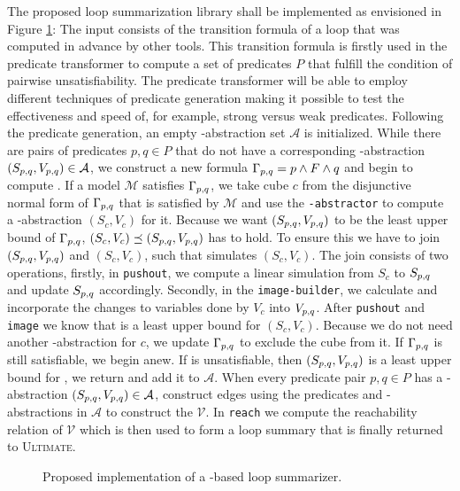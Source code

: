 
The proposed \qvasrs loop summarization library shall be implemented as envisioned in Figure \ref{fig}: The input consists of the transition formula of a loop that was computed in advance by other tools. This transition formula is firstly used in the predicate transformer to compute a set of predicates $P$ that fulfill the condition of pairwise unsatisfiability. The predicate transformer will be able to employ different techniques of predicate generation making it possible to test the effectiveness and speed of, for example, strong versus weak predicates. Following the predicate generation, an empty \qvasr-abstraction set $\mathcal{A}$ is initialized. While there are pairs of predicates $p, q \in P$ that do not have a corresponding \qvasr-abstraction $(S_{p, q}, V_{p, q}) \in \mathcal{A}$, we construct a new formula $\Gamma_{p, q} = p \land F \land q$ and begin to compute \pqvasr. If a model $\mathcal{M}$ satisfies $\Gamma_{p, q}$, we take cube $c$ from the disjunctive normal form of $\Gamma_{p, q}$ that is satisfied by $\mathcal{M}$ and use the \texttt{\qvasr-abstractor} to compute a \qvasr-abstraction $(S_c, V_c)$ for it. Because we want $(S_{p, q}, V_{p, q})$ to be the least upper bound of $\Gamma_{p, q}$, $(S_c, V_c) \preceq (S_{p, q}, V_{p, q})$ has to hold. To ensure this we have to join $(S_{p, q}, V_{p, q})$ and $(S_c, V_c)$, such that \pqvasr simulates $(S_c, V_c)$. The join consists of two operations, firstly, in \texttt{pushout}, we compute a linear simulation from $S_c$ to $S_{p, q}$ and update $S_{p, q}$ accordingly. Secondly, in the \texttt{image-builder}, we calculate and incorporate the changes to variables done by $V_c$ into $V_{p, q}$. After \texttt{pushout} and \texttt{image} we know that \pqvasr is a least upper bound for $(S_c, V_c)$. Because we do not need another \qvasr-abstraction for $c$, we update $\Gamma_{p, q}$ to exclude the cube from it. If $\Gamma_{p, q}$ is still satisfiable, we begin anew.
If \pqformula is unsatisfiable, then $(S_{p, q}, V_{p, q})$ is a least upper bound for \pqformula, we return and add it to $\mathcal{A}$. When every predicate pair $p, q \in P$ has a \qvasr-abstraction $(S_{p, q}, V_{p, q}) \in \mathcal{A}$, construct edges using the predicates and \qvasr-abstractions in $\mathcal{A}$ to construct the \qvasrs $\mathcal{V}$. In \texttt{reach} we compute the reachability relation of $\mathcal{V}$ which is then used to form a loop summary that is finally returned to \textsc{Ultimate}.
\begin{figure}[H]
    
    \caption{Proposed implementation of a \qvasrs-based loop summarizer.}
    \label{fig}
\end{figure}

